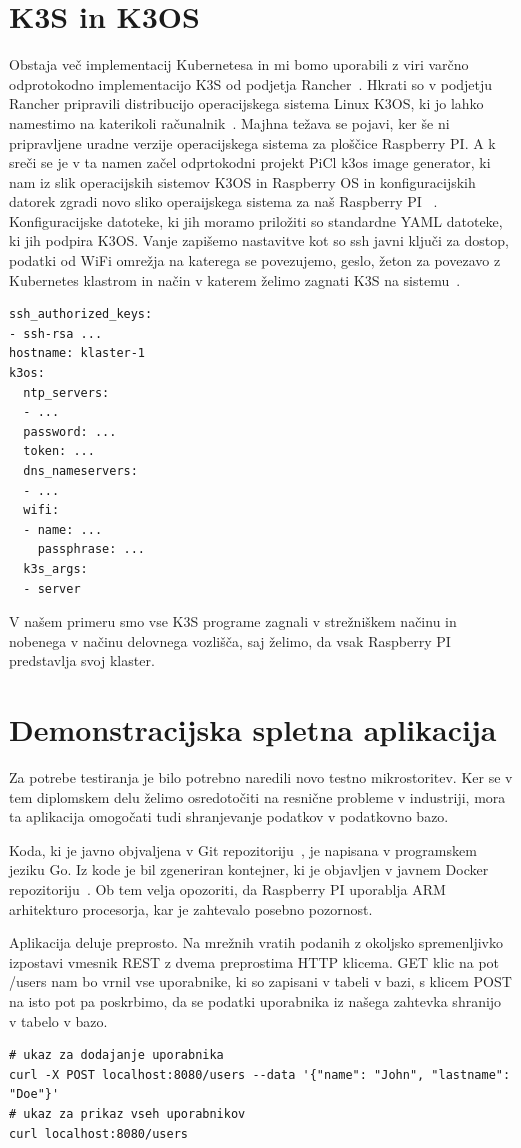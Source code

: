 \documentclass[a4paper, 12pt]{book}
\begin{document}
\section{K3S in K3OS}
Obstaja več implementacij Kubernetesa in mi bomo uporabili z viri varčno odprotokodno implementacijo K3S od podjetja Rancher~\cite{k3s-info}.
Hkrati so v podjetju Rancher pripravili distribucijo operacijskega sistema Linux K3OS, ki jo lahko namestimo na katerikoli računalnik~\cite{k3os-git}. 
Majhna težava se pojavi, ker še ni pripravljene uradne verzije operacijskega sistema za ploščice Raspberry PI.
A k sreči se je v ta namen začel odprtokodni projekt PiCl k3os image generator, ki nam iz slik operacijskih sistemov K3OS in Raspberry OS in konfiguracijskih datorek zgradi novo sliko operaijskega sistema za naš Raspberry PI ~\cite{k3os-rpi-image-generator}.
Konfiguracijske datoteke, ki jih moramo priložiti so standardne YAML datoteke, ki jih podpira K3OS.
Vanje zapišemo nastavitve kot so ssh javni ključi za dostop, podatki od WiFi omrežja na katerega se povezujemo, geslo, žeton za povezavo z Kubernetes klastrom in način v katerem želimo zagnati K3S na sistemu~\cite{k3os-git}.
\begin{verbatim}
ssh_authorized_keys:
- ssh-rsa ...
hostname: klaster-1
k3os:
  ntp_servers:
  - ...
  password: ...
  token: ...
  dns_nameservers:
  - ... 
  wifi:
  - name: ...
    passphrase: ...
  k3s_args:
  - server
\end{verbatim}
V našem primeru smo vse K3S programe zagnali v strežniškem načinu in nobenega v načinu delovnega vozlišča, saj želimo, da vsak Raspberry PI predstavlja svoj klaster.
\section{Demonstracijska spletna aplikacija}
Za potrebe testiranja je bilo potrebno naredili novo testno mikrostoritev.
Ker se v tem diplomskem delu želimo osredotočiti na resnične probleme v industriji, mora ta aplikacija omogočati tudi shranjevanje podatkov v podatkovno bazo.

Koda, ki je javno objvaljena v Git repozitoriju~\cite{git-stateful-rest-sample}, je napisana v programskem jeziku Go.
Iz kode je bil zgeneriran kontejner, ki je objavljen v javnem Docker repozitoriju~\cite{docker-stateful-rest-sample}.
Ob tem velja opozoriti, da Raspberry PI uporablja ARM arhitekturo procesorja, kar je zahtevalo posebno pozornost.

Aplikacija deluje preprosto.
Na mrežnih vratih podanih z okoljsko spremenljivko izpostavi vmesnik REST z dvema preprostima HTTP klicema.
GET klic na pot /users nam bo vrnil vse uporabnike, ki so zapisani v tabeli v bazi, s klicem POST na isto pot pa poskrbimo, da se podatki uporabnika iz našega zahtevka shranijo v tabelo v bazo.
\begin{verbatim}
# ukaz za dodajanje uporabnika
curl -X POST localhost:8080/users --data '{"name": "John", "lastname": "Doe"}'
# ukaz za prikaz vseh uporabnikov
curl localhost:8080/users
\end{verbatim}
\end{document}
